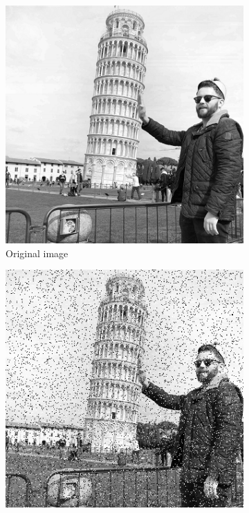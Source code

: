 \begin{figure}[h!]
	\centering
	\begin{subfigure}{.3\textwidth}
		\includegraphics[width=\textwidth]{Iorig.png}
		\caption{Original image}
		\label{fig: LAPLAR1}
	\end{subfigure}
	\begin{subfigure}{.3\textwidth}
		\includegraphics[width=\textwidth]{Inoise.png}

\end{subfigure}
\end{figure}
